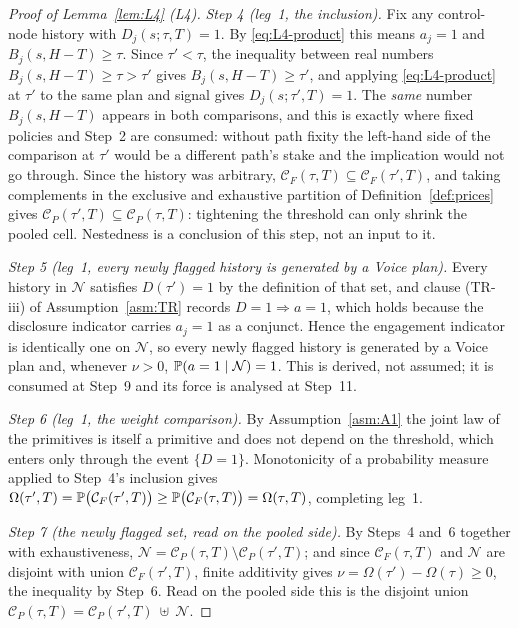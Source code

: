 \begin{proof}[Proof of Lemma~\ref{lem:L4} (L4)]
\emph{Step 4 (leg~1, the inclusion).} Fix any control-node history with $D_j(s;\tau,T) = 1$. By
\eqref{eq:L4-product} this means $a_j = 1$ and $B_j(s,H-T) \ge \tau$. Since $\tau' < \tau$, the
inequality between real numbers $B_j(s,H-T) \ge \tau > \tau'$ gives $B_j(s,H-T) \ge \tau'$, and
applying \eqref{eq:L4-product} at $\tau'$ to the same plan and signal gives $D_j(s;\tau',T) = 1$. The
\emph{same} number $B_j(s,H-T)$ appears in both comparisons, and this is exactly where fixed policies
and Step~2 are consumed: without path fixity the left-hand side of the comparison at $\tau'$ would be
a different path's stake and the implication would not go through. Since the history was arbitrary,
$\mathcal C_F(\tau,T) \subseteq \mathcal C_F(\tau',T)$, and taking complements in the exclusive and
exhaustive partition of Definition~\ref{def:prices} gives
$\mathcal C_P(\tau',T) \subseteq \mathcal C_P(\tau,T)$: tightening the threshold can only shrink the
pooled cell. Nestedness is a conclusion of this step, not an input to it.

\emph{Step 5 (leg~1, every newly flagged history is generated by a Voice plan).} Every history in
$\mathcal N$ satisfies $D(\tau') = 1$ by the definition of that set, and clause (TR-iii) of
Assumption~\ref{asm:TR} records $D = 1 \Rightarrow a = 1$, which holds because the disclosure
indicator carries $a_j = 1$ as a conjunct. Hence the engagement indicator is identically one on
$\mathcal N$, so every newly flagged history is generated by a Voice plan and, whenever $\nu > 0$,
$\mathbb{P}(a=1 \mid \mathcal N) = 1$. This is derived, not assumed; it is consumed at Step~9 and its force
is analysed at Step~11.

\emph{Step 6 (leg~1, the weight comparison).} By Assumption~\ref{asm:A1} the joint law of the
primitives is itself a primitive and does not depend on the threshold, which enters only through the
event $\{D=1\}$. Monotonicity of a probability measure applied to Step~4's inclusion gives
$\Omega(\tau',T) = \mathbb{P}\bigl(\mathcal C_F(\tau',T)\bigr) \ge \mathbb{P}\bigl(\mathcal C_F(\tau,T)\bigr)
= \Omega(\tau,T)$, completing leg~1.

\emph{Step 7 (the newly flagged set, read on the pooled side).} By Steps~4 and~6 together with
exhaustiveness, $\mathcal N = \mathcal C_P(\tau,T)\setminus\mathcal C_P(\tau',T)$; and since
$\mathcal C_F(\tau,T)$ and $\mathcal N$ are disjoint with union $\mathcal C_F(\tau',T)$, finite
additivity gives $\nu = \Omega(\tau')-\Omega(\tau) \ge 0$, the inequality by Step~6. Read on the
pooled side this is the disjoint union
$\mathcal C_P(\tau,T) = \mathcal C_P(\tau',T)\ \uplus\ \mathcal N$.


\end{proof}
